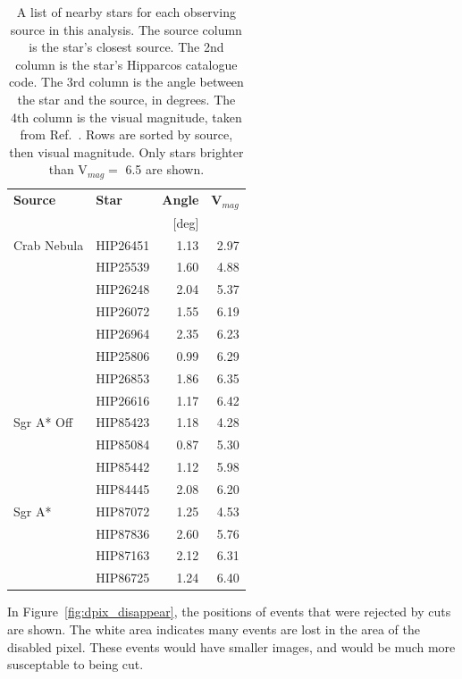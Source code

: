 \begin{table}[t]
  \centering
  \begin{tabular}{|l|l|r|r|}
    \hline
    \textbf{Source} & \textbf{Star} & \textbf{Angle} & \textbf{V${}_{mag}$} \\ 
                    &               & [deg]             &                      \\
    \hline
    Crab Nebula & HIP26451 & 1.13 & 2.97 \\
                & HIP25539 & 1.60 & 4.88 \\
                & HIP26248 & 2.04 & 5.37 \\
                & HIP26072 & 1.55 & 6.19 \\
                & HIP26964 & 2.35 & 6.23 \\
                & HIP25806 & 0.99 & 6.29 \\
                & HIP26853 & 1.86 & 6.35 \\
                & HIP26616 & 1.17 & 6.42 \\
    \hline
    Sgr A* Off  & HIP85423 & 1.18 & 4.28 \\
                & HIP85084 & 0.87 & 5.30 \\
                & HIP85442 & 1.12 & 5.98 \\
                & HIP84445 & 2.08 & 6.20 \\
    \hline
    Sgr A*      & HIP87072 & 1.25 & 4.53 \\
                & HIP87836 & 2.60 & 5.76 \\
                & HIP87163 & 2.12 & 6.31 \\
                & HIP86725 & 1.24 & 6.40 \\
    \hline
  \end{tabular}
  \caption[Bright Stars in the Fields of View]{
    A list of nearby stars for each observing source in this analysis.
    The source column is the star's closest source.
    The 2nd column is the star's Hipparcos catalogue code.
    The 3rd column is the angle between the star and the source, in degrees.
    The 4th column is the visual magnitude, taken from Ref.~\cite{hipparcos_catalogue}.
    Rows are sorted by source, then visual magnitude.
    Only stars brighter than V${}_{mag}=$ 6.5 are shown.
  }
  \label{tab:brightstars}
\end{table}

In Figure~\ref{fig:dpix_disappear}, the positions of events that were rejected by cuts are shown.
The white area indicates many events are lost in the area of the disabled pixel.
These events would have smaller images, and would be much more susceptable to being cut.

